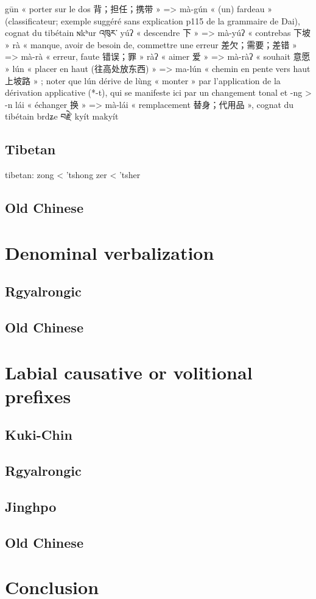 \documentclass[oneside,a4paper,11pt]{article}
\begin{document}
 \citet[4]{dai92yufa}
gūn « porter sur le dos 背；担任；携带 » => mà-gún « (un) fardeau » (classificateur; exemple suggéré sans explication p115 de la grammaire de Dai), cognat du tibétain ɴkʰur འཁུར་
yúʔ « descendre 下 » => mà-yúʔ « contrebas 下坡 »
rà « manque, avoir de besoin de, commettre une erreur 差欠；需要；差错 » => mà-rà « erreur, faute 错误；罪 »
ràʔ « aimer 爱 » => mà-ràʔ « souhait 意愿 »
lún « placer en haut (往高处放东西) » => ma-lún « chemin en pente vers haut 上坡路 » ; noter que lún dérive de lùng « monter » par l’application de la dérivation applicative (*-t), qui se manifeste ici par un changement tonal et -ng > -n
lái « échanger 换 » => mà-lái « remplacement 替身；代用品 », cognat du tibétain brdʑe བརྗེ་
kyít makyít

\subsection{Tibetan}
tibetan:
zong < 'tshong
zer < 'tsher
\subsection{Old Chinese}
\section{Denominal verbalization}
\subsection{Rgyalrongic}
\subsection{Old Chinese}
\section{Labial causative or volitional prefixes}
\subsection{Kuki-Chin}
\subsection{Rgyalrongic}
\subsection{Jinghpo}
\subsection{Old Chinese}
\section*{Conclusion}



\end{document}

